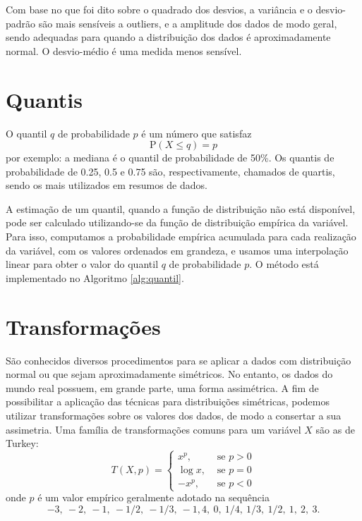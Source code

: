 Com base no que foi dito sobre o quadrado dos desvios, a variância e o
desvio-padrão são mais sensíveis a outliers, e a amplitude dos dados de modo
geral, sendo adequadas para quando a distribuição dos dados é aproximadamente
normal. O desvio-médio é uma medida menos sensível.

\section{Quantis}

O quantil $q$ de probabilidade $p$ é um número que satisfaz
\[
  \mathrm P(X \leq q) = p
\]
por exemplo: a mediana é o quantil de probabilidade de 50\%. Os quantis de
probabilidade de 0.25, 0.5 e 0.75 são, respectivamente, chamados de quartis,
sendo os mais utilizados em resumos de dados.

A estimação de um quantil, quando a função de distribuição não está disponível,
pode ser calculado utilizando-se da função de distribuição empírica da variável.
Para isso, computamos a probabilidade empírica acumulada para cada realização
da variável, com os valores ordenados em grandeza, e usamos uma interpolação
linear para obter o valor do quantil $q$ de probabilidade $p$. O método está
implementado no Algoritmo \ref{alg:quantil}.

\begin{algorithm}
\SetAlgoLined
{}
\caption{Método de Interpolação do Quantil Empírico}
\label{alg:quantil}
\end{algorithm}

\section{Transformações}

São conhecidos diversos procedimentos para se aplicar a dados com distribuição
normal ou que sejam aproximadamente simétricos. No entanto, os dados do mundo
real possuem, em grande parte, uma forma assimétrica. A fim de possibilitar
a aplicação das técnicas para distribuições simétricas, podemos utilizar
transformações sobre os valores dos dados, de modo a consertar a sua assimetria.
Uma família de transformações comuns para um variável $X$ são as de Turkey:
\[
  T(X, p) = \begin{cases}
    x^p,&\text{ se } p > 0\\
    \log x,&\text{ se } p = 0 \\
    -x^p,&\text{ se } p < 0
  \end{cases}
\]
onde $p$ é um valor empírico geralmente adotado na sequência
\[
  -3,\ -2,\ -1,\ -1/2,\ -1/3,\ -1,4,\ 0,\ 1/4,\ 1/3,\ 1/2,\ 1,\ 2,\ 3.
\]


